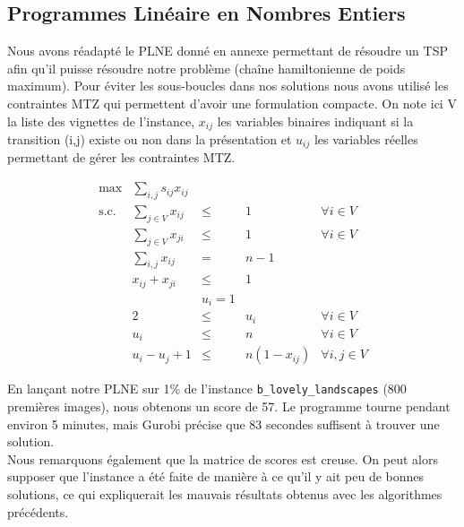 \documentclass[12pt,a4paper]{article}
\begin{document}
\subsection{Programmes Linéaire en Nombres Entiers}

\vspace{1\baselineskip}

\noindent Nous avons réadapté le PLNE donné en annexe permettant de résoudre un TSP afin qu'il puisse résoudre notre problème (chaîne hamiltonienne de poids maximum). Pour éviter les sous-boucles dans nos solutions nous avons utilisé les contraintes MTZ qui permettent d'avoir une formulation compacte. On note ici V la liste des vignettes de l'instance, $x_{ij}$ les variables binaires indiquant si la transition (i,j) existe ou non dans la présentation et $u_{ij}$ les variables réelles permettant de gérer les contraintes MTZ.

\vspace{1\baselineskip}

\begin{equation}
\begin{array}{rrclcl}
\displaystyle \max_{} & \displaystyle \sum_{i,j}^{} s_{ij}x_{ij} \\
\textrm{s.c.} &  \displaystyle \sum_{j \in V}^{} x_{ij} & \leq & 1 &  \forall i \in V\\
&  \displaystyle \sum_{j \in V}^{} x_{ji} & \leq & 1 & \forall i \in V\\
&  \displaystyle \sum_{i,j}^{} x_{ij} & = & n-1 \\
& x_{ij}  +  x_{ji} & \leq & 1\\
& & u_{i} = 1 &\\
& 2 & \leq & u_{i} & \forall i \in V\\
& u_i & \leq & n & \forall i \in V\\
& u_i - u_j + 1 & \leq & n(1-x_{ij}) & \forall i,j \in V
\end{array}
\end{equation}
\newpage

\noindent En lançant notre PLNE sur 1\% de l'instance \verb|b_lovely_landscapes| (800 premières images), nous obtenons un score de 57. Le programme tourne pendant environ 5 minutes, mais Gurobi précise que 83 secondes suffisent à trouver une solution.\\
Nous remarquons également que la matrice de scores est creuse. On peut alors supposer que l'instance a été faite de manière à ce qu'il y ait peu de bonnes solutions, ce qui expliquerait les mauvais résultats obtenus avec les algorithmes précédents.
\end{document}
